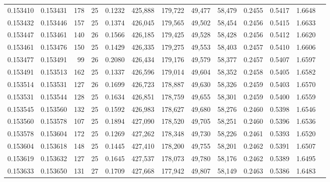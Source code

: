 \begin{tabular}{rrrrrrrrrrrrr}
0.153410 & 0.153431 & 178 &  25 &                                     0.1232 & 425,888 & 179,722 &  49,477 &  58,479 & 0.2455 & 0.5417 & 1.6648 \\
0.153432 & 0.153446 & 157 &  25 &                                     0.1374 & 426,045 & 179,565 &  49,502 &  58,454 & 0.2456 & 0.5415 & 1.6633 \\
0.153447 & 0.153461 & 140 &  26 &                                     0.1566 & 426,185 & 179,425 &  49,528 &  58,428 & 0.2456 & 0.5412 & 1.6620 \\
0.153461 & 0.153476 & 150 &  25 &                                     0.1429 & 426,335 & 179,275 &  49,553 &  58,403 & 0.2457 & 0.5410 & 1.6606 \\
0.153477 & 0.153491 &  99 &  26 &                                     0.2080 & 426,434 & 179,176 &  49,579 &  58,377 & 0.2457 & 0.5407 & 1.6597 \\
0.153491 & 0.153513 & 162 &  25 &                                     0.1337 & 426,596 & 179,014 &  49,604 &  58,352 & 0.2458 & 0.5405 & 1.6582 \\
0.153514 & 0.153531 & 127 &  26 &                                     0.1699 & 426,723 & 178,887 &  49,630 &  58,326 & 0.2459 & 0.5403 & 1.6570 \\
0.153531 & 0.153544 & 128 &  25 &                                     0.1634 & 426,851 & 178,759 &  49,655 &  58,301 & 0.2459 & 0.5400 & 1.6559 \\
0.153545 & 0.153560 & 132 &  25 &                                     0.1592 & 426,983 & 178,627 &  49,680 &  58,276 & 0.2460 & 0.5398 & 1.6546 \\
0.153560 & 0.153578 & 107 &  25 &                                     0.1894 & 427,090 & 178,520 &  49,705 &  58,251 & 0.2460 & 0.5396 & 1.6536 \\
0.153578 & 0.153604 & 172 &  25 &                                     0.1269 & 427,262 & 178,348 &  49,730 &  58,226 & 0.2461 & 0.5393 & 1.6520 \\
0.153604 & 0.153618 & 148 &  25 &                                     0.1445 & 427,410 & 178,200 &  49,755 &  58,201 & 0.2462 & 0.5391 & 1.6507 \\
0.153619 & 0.153632 & 127 &  25 &                                     0.1645 & 427,537 & 178,073 &  49,780 &  58,176 & 0.2462 & 0.5389 & 1.6495 \\
0.153633 & 0.153650 & 131 &  27 &                                     0.1709 & 427,668 & 177,942 &  49,807 &  58,149 & 0.2463 & 0.5386 & 1.6483 \\

\end{tabular}
